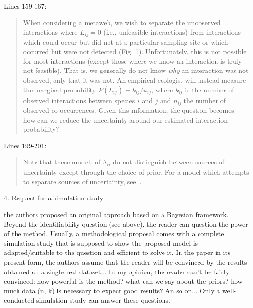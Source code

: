\documentclass[12pt]{letter}
\newenvironment{refquote}{\bigskip \begin{it}}{\end{it}\smallskip}
\begin{document}
		Lines 159-167:


		\begin{quotation}
			When considering a metaweb, we wish to separate the unobserved interactions where $L_{ij}=0$ (i.e., unfeasible interactions) from interactions which could occur but did not at a particular sampling site or which occurred but were not detected (Fig. 1). Unfortunately, this is not possible for most interactions (except those where we know an interaction is truly not feasible). That is, we generally do not know \emph{why} an interaction was not observed, only that it was not. An empirical ecologist will instead measure the marginal probability $P(L_{ij})=k_{ij}/n_{ij}$, where $k_{ij}$ is the number of observed interactions between species $i$ and $j$ and $n_{ij}$ the number of observed co-occurrences. Given this information, the question becomes: how can we reduce the uncertainty around our estimated interaction probability?
		\end{quotation}


		Lines 199-201:


		\begin{quotation}
			 Note that these models of $\lambda_{ij}$ do not distinguish between sources of uncertainty except through the choice of prior. For a model which attempts to separate sources of uncertainty, see~\citet{Weinstein2017}.
		\end{quotation}


	4. Request for a simulation study 


		\begin{refquote}
			the authors proposed an original approach based on a Bayesian framework. Beyond the identifiability question (see above), the reader can question the power of the method. Usually, a methodological proposal comes with a complete simulation study that is supposed to show  the proposed model is adapted/suitable to the question and efficient to solve it. In the paper in its present form, the authors assume that the reader will be convinced by the results obtained on a single real dataset... In my opinion, the reader can't be fairly convinced: how powerful is the method? what can we say about the priors? how much data (n, k) is necessary to expect good results? An so on... Only a well-conducted simulation study can answer these questions.
		\end{refquote}
\end{document}
